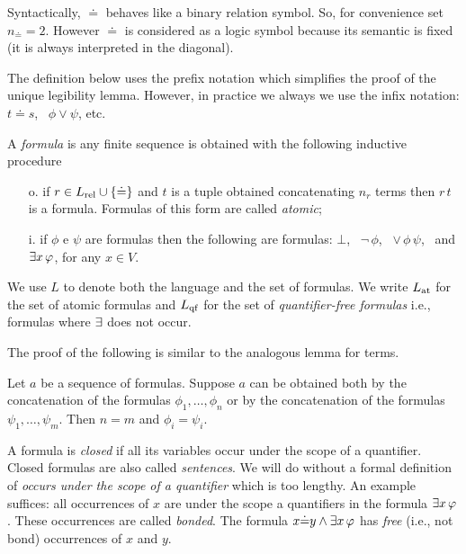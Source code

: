 

Syntactically, $\doteq$ behaves like a binary relation symbol. So, for convenience set $n_{\scriptscriptstyle\doteq}=2$. However $\doteq$ is considered as a logic symbol because its semantic is fixed (it is always interpreted in the diagonal).

The definition below uses the prefix notation which simplifies the proof of the unique legibility lemma. However, in practice we always we use the infix notation: $t\doteq s$, \ $\phi\vee\psi$, etc.


\begin{definition}\label{defformule} 
A \emph{formula\/} is any finite sequence is obtained with the following inductive procedure

\begin{itemize}
\item[o.] if $r\in L_{\rm rel}\cup \{\doteq\}$ and $t$ is a tuple obtained concatenating $n_r$ terms then $r\,t$ is a formula. Formulas of this form are called \emph{atomic};

\item[i.] if $\phi$ e $\psi$ are formulas then the following are formulas: $\bot$, \ ${\neg}\,\phi$, \ ${\vee}\,\phi\,\psi$, \ and $\exists x\,\varphi$, for any $x\in V$.\QED
\end{itemize}
\end{definition}


We use \emph{$L$\/} to denote both the language and the set of formulas. We write \emph{$L_{\rm at}$\/} for the set of atomic formulas and \emph{$L_{\rm qf}$\/} for the set of \emph{quantifier-free formulas\/} i.e., formulas where $\exists$ does not occur.

The proof of the following is similar to the analogous lemma for terms.

\begin{lemma}
\label{lemmaformuleleggibilita}
Let $a$ be a sequence of formulas. Suppose $a$ can be obtained both by the concatenation of the formulas $\phi_1,\dots,\phi_n$ or by the concatenation of the formulas $\psi_1,\dots,\psi_m$. Then $n=m$ and $\phi_i=\psi_i$.\QED
\end{lemma}


A formula is \emph{closed\/} if all its variables occur under the scope of a quantifier. Closed formulas are also called \emph{sentences}. We will do without a formal definition of \textit{occurs under the scope of a quantifier\/} which is too lengthy. An example suffices: all occurrences of $x$ are under the scope a quantifiers in the formula $\exists x\,\varphi$. These occurrences are called \emph{bonded}. The formula $x{\doteq}y\wedge\exists x\,\varphi$ has \emph{free\/} (i.e., not bond) occurrences of $x$ and $y$.

